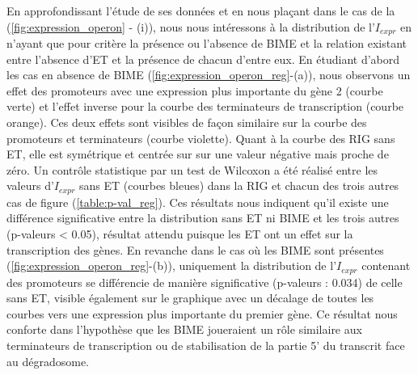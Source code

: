 \documentclass[12pt,a4paper]{report}
\begin{document}
\begin{onehalfspace}
En approfondissant l'étude de ses données et en nous plaçant dans le cas de la (\autoref{fig:expression_operon} - (i)), nous nous intéressons à la distribution de l'$I_{expr}$ en n'ayant que pour critère la présence ou l'absence de BIME et la relation existant entre l'absence d'ET et la présence de chacun d'entre eux. En étudiant d'abord les cas en absence de BIME (\autoref{fig:expression_operon_reg}-(a)), nous observons un effet des promoteurs avec une expression plus importante du gène 2 (courbe verte) et l'effet inverse pour la courbe des terminateurs de transcription (courbe orange). Ces deux effets sont visibles de façon similaire sur la courbe des promoteurs et terminateurs (courbe violette). Quant à la courbe des RIG sans ET, elle est symétrique et centrée sur sur une valeur négative mais proche de zéro. Un contrôle statistique par un test de Wilcoxon a été réalisé entre les valeurs d'$I_{expr}$ sans ET (courbes bleues) dans la RIG et chacun des trois autres cas de figure (\autoref{table:p-val_reg}). Ces résultats nous indiquent qu'il existe une différence significative entre la distribution sans ET ni BIME et les trois autres (p-valeurs < 0.05), résultat attendu puisque les ET ont un effet sur la transcription des gènes. En revanche dans le cas où les BIME sont présentes (\autoref{fig:expression_operon_reg}-(b)), uniquement la distribution de l'$I_{expr}$ contenant des promoteurs se différencie de manière significative (p-valeurs : 0.034) de celle sans ET, visible également sur le graphique avec un décalage de toutes les courbes vers une expression plus importante du premier gène. Ce résultat nous conforte dans l'hypothèse que les BIME joueraient un rôle similaire aux terminateurs de transcription ou de stabilisation de la partie 5' du transcrit face au dégradosome.


\end{onehalfspace}
\end{document}
